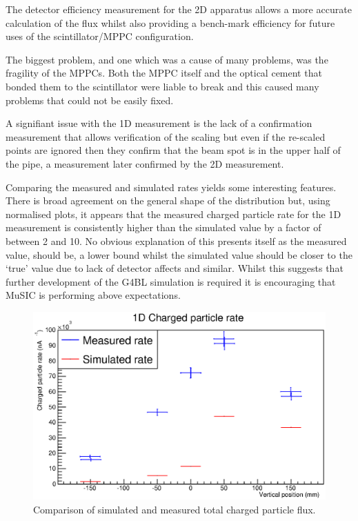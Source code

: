 The detector efficiency measurement for the 2D apparatus allows a more accurate calculation of the flux whilst also providing a bench-mark efficiency for future uses of the scintillator/MPPC configuration. 

The biggest problem, and one which was a cause of many problems, was the fragility of the MPPCs. Both the MPPC itself and the optical cement that bonded them to the scintillator were liable to break and this caused many problems that could not be easily fixed. 

A signifiant issue with the 1D measurement is the lack of a confirmation measurement that allows verification of the scaling but even if the re-scaled points are ignored then they confirm that the beam spot is in the upper half of the pipe, a measurement later confirmed by the 2D measurement. 

Comparing the measured and simulated rates yields some interesting features. There is broad agreement on the general shape of the distribution but, using normalised plots, it appears that the measured charged particle rate for the 1D measurement is consistently higher than the simulated value by a factor of between 2 and 10. No obvious explanation of this presents itself as the measured value, should be, a lower bound whilst the simulated value should be closer to the `true' value due to lack of detector affects and similar. Whilst this suggests that further development of the G4BL simulation is required it is encouraging that MuSIC is performing above expectations.

\begin{figure}[hptb]
  \centering
    \includegraphics[width=.9\textwidth]{images/plot_generating_scripts/1D_charged_particle_flux.eps}
  \caption{Comparison of simulated and measured total charged particle flux.}
  \label{fig:images_plot_generating_scripts_1D_charged_particle_flux}
\end{figure}
  
